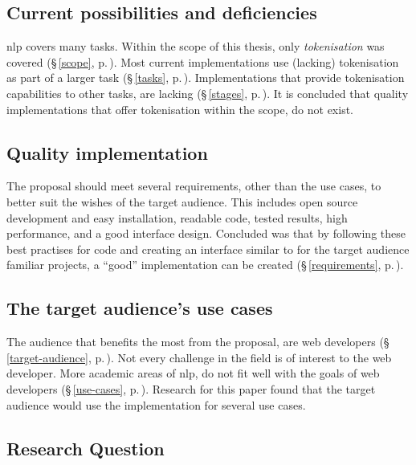 \subsection{Current possibilities and
  deficiencies}\label{q-current-possibilities}

\gls{nlp} covers many tasks.
Within the scope of this thesis, only \emph{tokenisation} was covered
  (§\,\ref{scope}, p.\,\pageref{scope}).
Most current implementations use (lacking) tokenisation as part of a larger
  task (§\,\ref{tasks}, p.\,\pageref{tasks}).
Implementations that provide tokenisation capabilities to other tasks,
  are lacking (§\,\ref{stages}, p.\,\pageref{stages}).
It is concluded that quality implementations that offer tokenisation within
  the scope, do not exist.

\subsection{Quality implementation}\label{q-quality-implementation}

The proposal should meet several requirements, other than the use cases,
  to better suit the wishes of the target audience.
This includes open source development and easy installation, readable code,
  tested results, high performance, and a good interface design.
Concluded was that by following these best practises for code and creating
  an interface similar to for the target audience familiar projects, a
  ``good'' implementation can be created (§\,\ref{requirements},
  p.\,\pageref{requirements}).

\subsection{The target audience's use cases}\label{q-use-cases}

The audience that benefits the most from the proposal, are web developers
  (§\,\ref{target-audience}, p.\,\pageref{target-audience}).
Not every challenge in the field is of interest to the web developer.
More academic areas of \gls{nlp}, do not fit well with the goals of web
  developers (§\,\ref{use-cases}, p.\,\pageref{use-cases}).
Research for this paper found that the target audience would use the
  implementation for several use cases.

\subsection{Research Question}\label{q-research-question}

